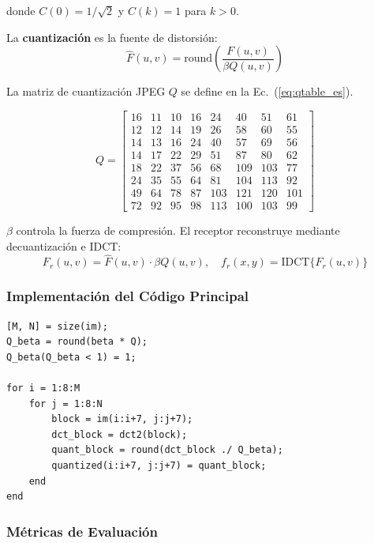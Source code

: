 \documentclass[12pt, a4paper]{article}
\begin{document}
donde $C(0)=1/\sqrt{2}$ y $C(k)=1$ para $k>0$.

La \textbf{cuantizaci\'on} es la fuente de distorsi\'on:
\begin{equation}
\hat{F}(u,v) = \text{round}\left(\frac{F(u,v)}{\beta Q(u,v)}\right)
\label{eq:quant_es}
\end{equation}

La matriz de cuantizaci\'on JPEG $Q$ se define en la Ec.~(\ref{eq:qtable_es}).

\begin{equation}
Q = \begin{bmatrix}
16 & 11 & 10 & 16 & 24 & 40 & 51 & 61\\
12 & 12 & 14 & 19 & 26 & 58 & 60 & 55\\
14 & 13 & 16 & 24 & 40 & 57 & 69 & 56\\
14 & 17 & 22 & 29 & 51 & 87 & 80 & 62\\
18 & 22 & 37 & 56 & 68 & 109 & 103 & 77\\
24 & 35 & 55 & 64 & 81 & 104 & 113 & 92\\
49 & 64 & 78 & 87 & 103 & 121 & 120 & 101\\
72 & 92 & 95 & 98 & 113 & 100 & 103 & 99
\end{bmatrix}
\label{eq:qtable_es}
\end{equation}

$\beta$ controla la fuerza de compresi\'on. El receptor reconstruye mediante decuantizaci\'on e IDCT:
\begin{equation}
F_r(u,v) = \hat{F}(u,v) \cdot \beta Q(u,v), \quad f_r(x,y) = \text{IDCT}\{F_r(u,v)\}
\label{eq:recon_es}
\end{equation}

\subsubsection{Implementaci\'on del C\'odigo Principal}

\begin{lstlisting}[caption=Cuantizaci\'on DCT por bloques]
[M, N] = size(im);
Q_beta = round(beta * Q);
Q_beta(Q_beta < 1) = 1;

for i = 1:8:M
    for j = 1:8:N
        block = im(i:i+7, j:j+7);
        dct_block = dct2(block);
        quant_block = round(dct_block ./ Q_beta);
        quantized(i:i+7, j:j+7) = quant_block;
    end
end
\end{lstlisting}

\subsubsection{M\'etricas de Evaluaci\'on}
\end{document}
